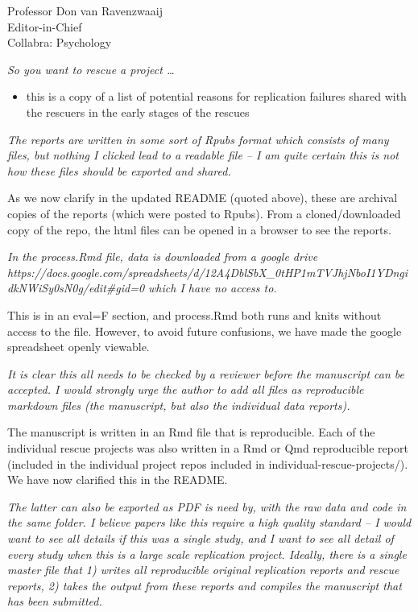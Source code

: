 \documentclass{stanfordletter}
\newcommand{\theysaid}[1]{\begin{leftbar} \noindent 
		\textsl{ #1}\end{leftbar}}
\begin{document}
\begin{letter}{Professor Don van Ravenzwaaij \\ Editor-in-Chief \\ Collabra: Psychology }
{			
			\textit{So you want to rescue a project
				\ldots{}}\label{so-you-want-to-rescue-a-project}
			
			\begin{itemize}
				\item
				this is a copy of a list of potential reasons for replication failures
				shared with the rescuers in the early stages of the rescues
			\end{itemize}
		}

		
		\theysaid{The reports are written in some sort of Rpubs format which consists of many files, but nothing I clicked lead to a readable file – I am quite certain this is not how these files should be exported and shared.}
		
		As we now clarify in the updated README (quoted above), these are archival copies of the reports (which were posted to Rpubs). From a cloned/downloaded copy of the repo, the html files can be opened in a browser to see the reports.
	
		
		\theysaid{In the process.Rmd file, data is downloaded from a google drive https://docs.google.com/spreadsheets/d/12A4DblSbX\_0tHP1mTVJhjNboI1YDngidkNWiSy0sN0g/edit\#gid=0 which I have no access to. }
		
		This is in an eval=F section, and process.Rmd both runs and knits without access to the file. However, to avoid future confusions, we have made the google spreadsheet openly viewable. 
		
		\theysaid{It is clear this all needs to be checked by a reviewer before the manuscript can be accepted. I would strongly urge the author to add all files as reproducible markdown files (the manuscript, but also the individual data reports).}
		
		The manuscript is written in an Rmd file that is reproducible. Each of the individual rescue projects was also written in a Rmd or Qmd reproducible report (included in the individual project repos included in individual-rescue-projects/). We have now clarified this in the README. 
		
		
		\theysaid{ The latter can also be exported as PDF is need by, with the raw data and code in the same folder. I believe papers like this require a high quality standard – I would want to see all details if this was a single study, and I want to see all detail of every study when this is a large scale replication project. Ideally, there is a single master file that 1) writes all reproducible original replication reports and rescue reports, 2) takes the output from these reports and compiles the manuscript that has been submitted.}
		

\end{letter}
\end{document}
